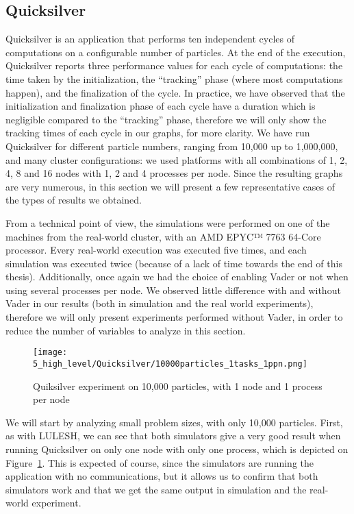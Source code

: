 \subsection{Quicksilver}
\label{subsec:5_high_level:quicksilver}

Quicksilver is an application that performs ten independent cycles of
computations on a configurable number of particles. At the end of the execution,
Quicksilver reports three performance values for each cycle of computations: the
time taken by the initialization, the ``tracking'' phase (where most
computations happen), and the finalization of the cycle. In practice, we have
observed that the initialization and finalization phase of each cycle have a
duration which is negligible compared to the ``tracking'' phase, therefore we
will only show the tracking times of each cycle in our graphs, for more clarity.
We have run Quicksilver for different particle numbers, ranging from 10,000 up
to 1,000,000, and many cluster configurations: we used platforms with all
combinations of 1, 2, 4, 8 and 16 nodes with 1, 2 and 4 processes per node.
Since the resulting graphs are very numerous, in this section we will present a
few representative cases of the types of results we obtained.

From a technical point of view, the simulations were performed on one of the
machines from the real-world cluster, with an AMD EPYC™ 7763 64-Core processor.
Every real-world execution was executed five times, and each simulation was
executed twice (because of a lack of time towards the end of this thesis).
Additionally, once again we had the choice of enabling Vader or not when using
several processes per node. We observed little difference with and without Vader
in our results (both in simulation and the real world experiments), therefore we
will only present experiments performed without Vader, in order to reduce the
number of variables to analyze in this section.

\begin{figure}[!b]
    \centering
    \texttt{[image: 5\_high\_level/Quicksilver/10000particles\_1tasks\_1ppn.png]}
    \caption{Quiksilver experiment on 10,000 particles, with 1 node and 1 process per node}
    \label{fig:5_high_level:quicksilver_1tasks_1ppn}
\end{figure}

We will start by analyzing small problem sizes, with only 10,000 particles.
First, as with LULESH, we can see that both simulators give a very good result
when running Quicksilver on only one node with only one process, which is
depicted on Figure~\ref{fig:5_high_level:quicksilver_1tasks_1ppn}. This is
expected of course, since the simulators are running the application with no
communications, but it allows us to confirm that both simulators work and that
we get the same output in simulation and the real-world experiment.

